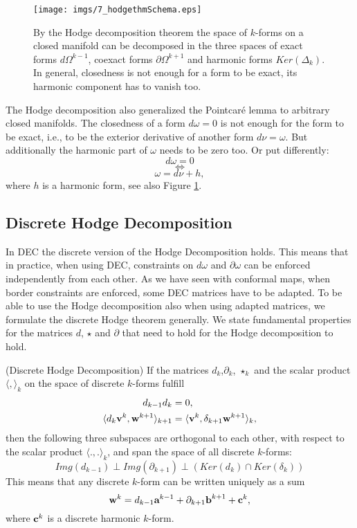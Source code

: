 \begin{figure}%
\begin{center}
\texttt{[image: imgs/7\_hodgethmSchema.eps]}%
\end{center}
\vspace{-0.5cm}
\caption{By the Hodge decomposition theorem the space of $k$-forms on a closed manifold can be decomposed in the three spaces  of exact forms $d\Omega^{k-1}$, coexact forms $\partial\Omega^{k+1}$ and harmonic forms $Ker(\Delta_k)$. In general, closedness is not enough for a form to be exact, its harmonic component has to vanish too.}%
\label{fig:hodgeDecomp}%
\end{figure}

The Hodge decomposition also generalized the Pointcar\'e lemma to arbitrary closed manifolds. The closedness of a form $d\omega = 0$ is not enough for the form to be exact, i.e., to be the exterior derivative of another form $d\nu = \omega$. But additionally the harmonic part of $\omega$ needs to be zero too. Or put differently:
\[d \omega = 0\]
\[\Leftrightarrow\]
\[\omega = d \nu + h,\]
where $h$ is a harmonic form, see also Figure \ref{fig:hodgeDecomp}.


\subsection{Discrete Hodge Decomposition}
In DEC the discrete version of the Hodge Decomposition holds. This  means that in practice, when using DEC, constraints on $d\omega$ and $\partial \omega$ can be enforced independently from each other. As we have seen with conformal maps, when border constraints are enforced, some DEC matrices have to be adapted. To be able to use the Hodge decomposition also when using adapted matrices, we formulate the discrete Hodge theorem generally. We state fundamental properties for the matrices $d$, $\star$ and $\partial$ that need to hold for the Hodge decomposition to hold.

\begin{thm}(Discrete Hodge Decomposition) If the matrices $d_k$,$\partial_k$, $\star_k$ and the scalar product $\langle , \rangle_k$ on the space of discrete $k$-forms fulfill
\begin{align}
d_{k-1} d_{k} &= 0, \\
\langle  d_k\textbf{v}^k,\textbf{w}^{k+1} \rangle_{k+1} &= \langle  \textbf{v}^k,\delta_{k+1}\textbf{w}^{k+1} \rangle_k, \label{eq:adjoint}
\end{align}
then the following three subspaces are orthogonal to each other, with respect to the scalar product $\langle.,.\rangle_k$, and span the space of all discrete $k$-forms:
\[Img(d_{k-1}) \perp Img (\partial_{k+1}) \perp \left(Ker(d_k) \cap Ker(\delta_k)\right)\]
This means that any discrete $k$-form can be written uniquely as a sum
\[\textbf{w}^k = d_{k-1} \textbf{a}^{k-1} + \partial_{k+1} \textbf{b}^{k+1} + \textbf{c}^k,\]
where $\textbf{c}^k$ is a discrete harmonic $k$-form.
\end{thm}

